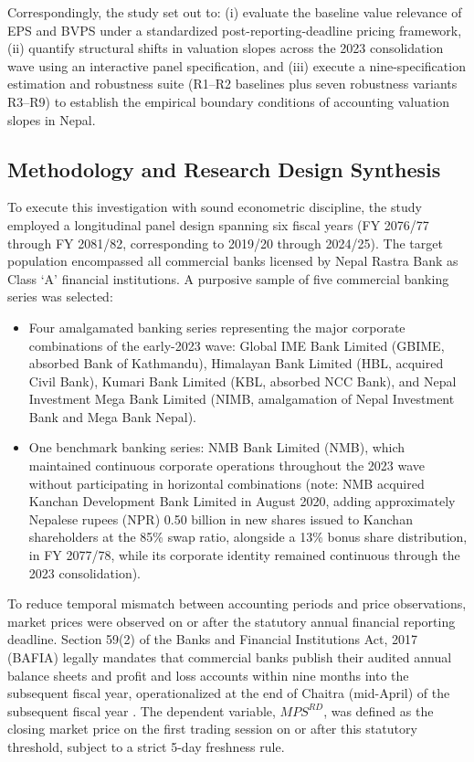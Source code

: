 Correspondingly, the study set out to: (i) evaluate the baseline value relevance of EPS and BVPS under a standardized post-reporting-deadline pricing framework, (ii) quantify structural shifts in valuation slopes across the 2023 consolidation wave using an interactive panel specification, and (iii) execute a nine-specification estimation and robustness suite (R1--R2 baselines plus seven robustness variants R3--R9) to establish the empirical boundary conditions of accounting valuation slopes in Nepal.

\subsection{Methodology and Research Design Synthesis}
To execute this investigation with sound econometric discipline, the study employed a longitudinal panel design spanning six fiscal years (FY 2076/77 through FY 2081/82, corresponding to 2019/20 through 2024/25). The target population encompassed all commercial banks licensed by Nepal Rastra Bank as Class `A' financial institutions. A purposive sample of five commercial banking series was selected:
\begin{itemize}
    \item Four amalgamated banking series representing the major corporate combinations of the early-2023 wave: Global IME Bank Limited (GBIME, absorbed Bank of Kathmandu), Himalayan Bank Limited (HBL, acquired Civil Bank), Kumari Bank Limited (KBL, absorbed NCC Bank), and Nepal Investment Mega Bank Limited (NIMB, amalgamation of Nepal Investment Bank and Mega Bank Nepal).
    \item One benchmark banking series: NMB Bank Limited (NMB), which maintained continuous corporate operations throughout the 2023 wave without participating in horizontal combinations (note: NMB acquired Kanchan Development Bank Limited in August 2020, adding approximately Nepalese rupees (NPR) 0.50 billion in new shares issued to Kanchan shareholders at the 85\% swap ratio, alongside a 13\% bonus share distribution, in FY 2077/78, while its corporate identity remained continuous through the 2023 consolidation).
\end{itemize}

To reduce temporal mismatch between accounting periods and price observations, market prices were observed on or after the statutory annual financial reporting deadline. Section 59(2) of the Banks and Financial Institutions Act, 2017 (BAFIA) legally mandates that commercial banks publish their audited annual balance sheets and profit and loss accounts within nine months into the subsequent fiscal year, operationalized at the end of Chaitra (mid-April) of the subsequent fiscal year \citep{bafia2017}. The dependent variable, $\mathit{MPS}^{RD}$, was defined as the closing market price on the first trading session on or after this statutory threshold, subject to a strict 5-day freshness rule.

